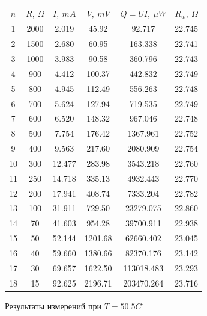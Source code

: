 \documentclass[a4paper,12pt]{report}
\begin{document}
    \begin{figure}[H]
        \centering
        \begin{tabular}{|c|c|c|c|c|c|}
            \hline
            $n$ & $R,\ \Omega$ & $I, \ mA$ & $V,\ mV$ & $Q=UI,\ \mu W$ & $R_{w}, \ \Omega$ \\
            \hline
            1 & 2000 & 2.019 & 45.92 & 92.717 & 22.745 \\
            \hline
            2 & 1500 & 2.680 & 60.95 & 163.338 & 22.741 \\
            \hline
            3 & 1000 & 3.983 & 90.58 & 360.796 & 22.743 \\
            \hline
            4 & 900 & 4.412 & 100.37 & 442.832 & 22.749 \\
            \hline
            5 & 800 & 4.945 & 112.49 & 556.263 & 22.748 \\
            \hline
            6 & 700 & 5.624 & 127.94 & 719.535 & 22.749 \\
            \hline
            7 & 600 & 6.520 & 148.32 & 967.046 & 22.748 \\
            \hline
            8 & 500 & 7.754 & 176.42 & 1367.961 & 22.752 \\
            \hline
            9 & 400 & 9.563 & 217.60 & 2080.909 & 22.754 \\
            \hline
            10 & 300 & 12.477 & 283.98 & 3543.218 & 22.760 \\
            \hline
            11 & 250 & 14.718 & 335.13 & 4932.443 & 22.770 \\
            \hline
            12 & 200 & 17.941 & 408.74 & 7333.204 & 22.782 \\
            \hline
            13 & 100 & 31.911 & 729.50 & 23279.075 & 22.860 \\
            \hline
            14 & 70 & 41.603 & 954.28 & 39700.911 & 22.938 \\
            \hline
            15 & 50 & 52.144 & 1201.68 & 62660.402 & 23.045 \\
            \hline
            16 & 40 & 59.660 & 1380.66 & 82370.176 & 23.142 \\
            \hline
            17 & 30 & 69.657 & 1622.50 & 113018.483 & 23.293 \\
            \hline
            18 & 15 & 92.625 & 2196.71 & 203470.264 & 23.716 \\
            \hline
        \end{tabular}
        \caption{Результаты измерений при $T=50.5C^\circ$}
    \end{figure}
\end{document}

